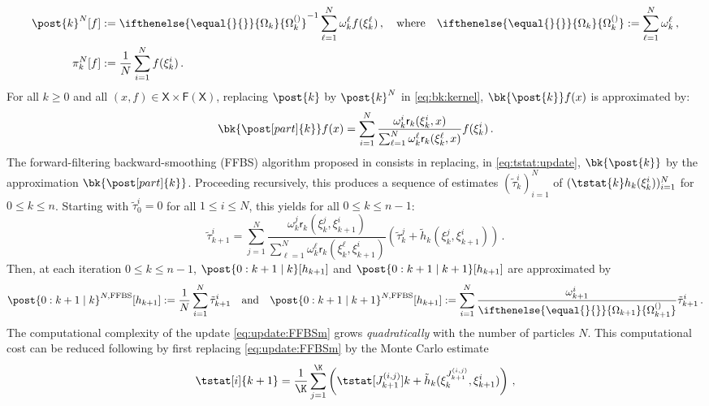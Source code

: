 \documentclass[nolayout]{article}
\newcommand{\eqsp}{\,}
\def\Xset{\mathsf{X}}
\newcommand{\af}[1]{h_{#1}}
\newcommand{\bmf}[1]{\set{F}(#1)}
\newcommand{\set}[1]{\mathsf{#1}}
\newcommand{\addf}[1]{\termletter_{#1}}
\newcommand{\termletter}{\tilde{h}}
\newcommand{\N}{N}
\newcommand{\partpred}[1]{\pi_{#1}^\N}
\newcommand{\tstattil}[2]{\tilde{\tau}_{#2}^{#1}}
\newcommand{\bi}[3]{J_{#1}^{(#2, #3)}}
\newcommand{\eqdef}{\ensuremath{:=}}
\newcommand{\ewght}[2]{\ensuremath{\omega_{#1}^{#2}}}
\newcommand{\epart}[2]{\ensuremath{\xi_{#1}^{#2}}}
\newcommand{\sumwght}[2][]{%
\ifthenelse{\equal{#1}{}}{\ensuremath{\Omega_{#2}}}{\ensuremath{\Omega_{#2}^{(#1)}}}}
\newcommand{\qg}[1]{\mathsf{r}_{#1}}
\begin{document}
\begin{align*}
\post{k}^\N[f]&\eqdef \sumwght{k}^{-1}\sum_{\ell=1}^N \ewght{k}{\ell}f(\epart{k}{\ell})\eqsp,\quad\mbox{where}\quad\sumwght{k}\eqdef \sum_{\ell=1}^\N \ewght{k}{\ell}\eqsp,\\
\partpred{k}[f] &\eqdef \frac{1}{\N} \sum_{i=1}^{\N} f(\epart{k}{i})\eqsp.
\end{align*}
For all $k\ge 0$ and all $(x, f) \in \Xset \times \bmf{\Xset}$, replacing $\post{k}$ by $\post{k}^N$ in \eqref{eq:bk:kernel}, $\bk{\post{k}}f(x)$ is approximated by: 
\begin{equation} 
	\bk{\post[part]{k}}f(x) = \sum_{i=1}^{\N} \frac{\ewght{k}{i} \qg{k}(\epart{k}{i},x)}{\sum_{\ell =1}^{\N} \ewght{k}{\ell} \qg{k}(\epart{k}{\ell},x)}f(\epart{k}{i})\eqsp.  
\label{eq:bk:part}
\end{equation}
The forward-filtering  backward-smoothing (FFBS) algorithm proposed in \cite{delmoral:doucet:singh:2010} consists in replacing, in \eqref{eq:tstat:update}, $\bk{\post{k}}$ by the approximation $\bk{\post[part]{k}}$. Proceeding recursively, this produces a sequence of estimates $(\tstattil{i}{k})_{i=1}^{\N}$ of $(\tstat{k}\af{k}(\epart{k}{i}))_{i=1}^{\N}$ for $0\leqslant k\leqslant n$. Starting with $\tstattil{i}{0} = 0$ for all $1\leqslant i \leqslant \N$, this yields for all $0\leqslant k\leqslant n-1$:
\begin{equation}
\label{eq:update:FFBSm}
\tstattil{i}{k+1} = \sum_{j = 1}^{\N} \frac{\ewght{k}{j} \qg{k}(\epart{k}{j}, \epart{k+1}{i})}{\sum_{\ell = 1}^{\N} \ewght{k}{\ell} \qg{k}(\epart{k}{\ell}, \epart{k+1}{i}) }\left( \tstattil{j}{k} + \addf{k}(\epart{k}{j}, \epart{k+1}{i}) \right)\eqsp. 
\end{equation}
Then, at each iteration $0\le k \le n-1$, $\post{0:k+1 \mid k}[\af{k+1}]$ and $\post{0:k+1 \mid k+1}[\af{k+1}]$ are approximated by
$$
\post{0:k+1 \mid k}^{\N,\textrm{FFBS}} [\af{k+1}] \eqdef \frac{1}{\N} \sum_{i=1}^{\N} \tstattil{i}{k+1} \quad \mathrm{and}\quad \post{0:k+1 \mid k+1}^{N,\textrm{FFBS}} [\af{k+1}] \eqdef \sum_{i=1}^{\N} \frac{\ewght{k+1}{i}}{\sumwght{k+1}}\tstattil{i}{k+1}\eqsp.
$$
The computational complexity of the update \eqref{eq:update:FFBSm} grows \emph{quadratically} with the number of particles $\N$. This computational cost can be reduced following \cite{olsson:westerborn:2014b} by first replacing \eqref{eq:update:FFBSm} by the Monte Carlo estimate
\begin{equation}
\label{eq:update:paris}
\tstat[i]{k+1} = \frac{1}{\K} \sum_{j=1}^{\K} \left( \tstat[\bi{k+1}{i}{j}]{k} + \addf{k}(\epart{k}{\bi{k+1}{i}{j}}, \epart{k+1}{i})\right)\eqsp, 
\end{equation}
\end{document}
